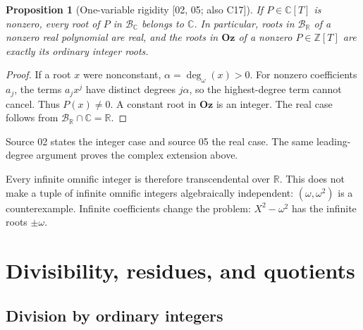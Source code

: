 \documentclass[11pt,oneside]{article}
\numberwithin{equation}{section}
\newtheorem{proposition}[proposition]{Proposition}
\theoremstyle{definition}
\theoremstyle{remark}
\newcommand{\Oz}{\mathbf{Oz}}
\newcommand{\Z}{\mathbb Z}
\newcommand{\R}{\mathbb R}
\newcommand{\C}{\mathbb C}
\newcommand{\BR}{\mathcal B_{\R}}
\newcommand{\BC}{\mathcal B_{\C}}
\newcommand{\ddeg}{\operatorname{deg}_{\omega}}
\newcommand{\src}[1]{\textup{\textsf{\small[#1]}}}
\begin{document}
\begin{proposition}[One-variable rigidity \src{02, 05; also C17}]\label{odg:prop:univariate}
If $P\in\C[T]$ is nonzero, every root of $P$ in $\BC$ belongs to $\C$.
In particular, roots in $\BR$ of a nonzero real polynomial are real, and
the roots in $\Oz$ of a nonzero $P\in\Z[T]$ are exactly its ordinary
integer roots.
\end{proposition}
\begin{proof}
If a root $x$ were nonconstant, $\alpha=\ddeg(x)>0$. For nonzero
coefficients $a_j$, the terms $a_jx^j$ have distinct degrees $j\alpha$, so
the highest-degree term cannot cancel. Thus $P(x)\ne0$. A constant root in
$\Oz$ is an integer. The real case follows from $\BR\cap\C=\R$.
\end{proof}

Source 02 states the integer case and source 05 the real case. The same
leading-degree argument proves the complex extension above.

Every infinite omnific integer is therefore transcendental over $\R$. This
does not make a tuple of infinite omnific integers algebraically independent:
$(\omega,\omega^2)$ is a counterexample. Infinite coefficients change the
problem: $X^2-\omega^2$ has the infinite roots $\pm\omega$.

\section{Divisibility, residues, and quotients}\label{odg:sec:residues}

\subsection{Division by ordinary integers}
\end{document}

